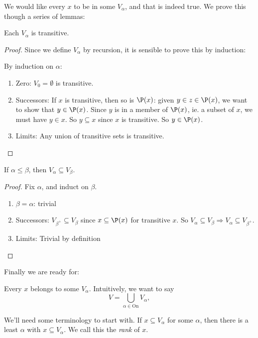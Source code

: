 \documentclass[a4paper]{article}
\begin{document}
We would like every $x$ to be in some $V_\alpha$, and that is indeed true. We prove this though a series of lemmas:

\begin{lemma}
  Each $V_\alpha$ is transitive.
\end{lemma}

\begin{proof}
  Since we define $V_\alpha$ by recursion, it is sensible to prove this by induction:

  By induction on $\alpha$:
  \begin{enumerate}
    \item Zero: $V_0 = \emptyset$ is transitive.
    \item Successors: If $x$ is transitive, then so is $\P(x)$: given $y\in z\in \P(x)$, we want to show that $y\in \P(x)$. Since $y$ is in a member of $\P(x)$, ie. a subset of $x$, we must have $y\in x$. So $y\subseteq x$ since $x$ is transitive. So $y\in \P(x)$.
    \item Limits: Any union of transitive sets is transitive.
  \end{enumerate}
\end{proof}

\begin{lemma}
  If $\alpha \leq \beta$, then $V_\alpha \subseteq V_\beta$.
\end{lemma}

\begin{proof}
  Fix $\alpha$, and induct on $\beta$.
  \begin{enumerate}
    \item $\beta = \alpha$: trivial
    \item Successors: $V_{\beta^+}\subseteq V_\beta$ since $x\subseteq \P(x)$ for transitive $x$. So $V_\alpha \subseteq V_\beta \Rightarrow  V_\alpha \subseteq V_{\beta^+}$.
    \item Limits: Trivial by definition
  \end{enumerate}
\end{proof}

Finally we are ready for:
\begin{thm}
  Every $x$ belongs to some $V_\alpha$. Intuitively, we want to say
  \[
    V = \bigcup_{\alpha \in \mathrm{On}} V_\alpha,
  \]
\end{thm}
We'll need some terminology to start with. If $x\subseteq V_\alpha$ for some $\alpha$, then there is a least $\alpha$ with $x\subseteq V_\alpha$. We call this the \emph{rank} of $x$.
\end{document}
